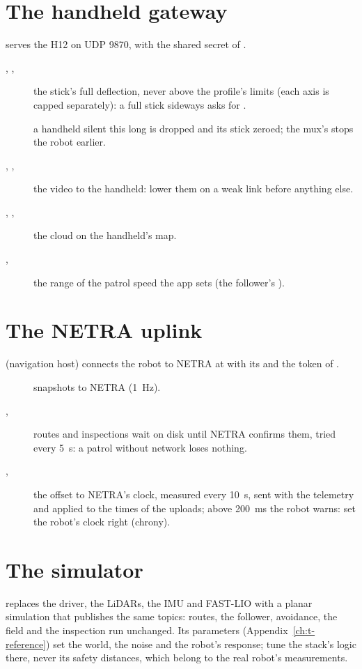 \section{The handheld gateway}

 serves the H12 on UDP  9870, with the shared secret of
.

\begin{description}
  \item[, , ] the stick's full deflection, never above the
    profile's limits (each axis is capped separately): a full stick sideways asks for .
  \item[] a handheld silent this long is dropped and its stick zeroed; the
    mux's  stops the robot earlier.
  \item[, , ] the video to the
    handheld: lower them on a weak link before anything else.
  \item[, , ] the cloud on the handheld's
    map.
  \item[, ] the range of the patrol speed the app
    sets (the follower's ).
\end{description}

\section{The NETRA uplink}

 (navigation host) connects the robot to NETRA at  with
its  and the token of .

\begin{description}
  \item[] snapshots to NETRA (\SI{1}{Hz}).
  \item[, ] routes and inspections wait on disk until
    NETRA confirms them, tried every \SI{5}{s}: a patrol without network loses nothing.
  \item[, ] the offset to NETRA's clock, measured
    every \SI{10}{s}, sent with the telemetry and applied to the times of the uploads; above
    \SI{200}{ms} the robot warns: set the robot's clock right (chrony).
\end{description}

\section{The simulator}

 replaces the driver, the LiDARs, the IMU and FAST-LIO with a planar simulation that
publishes the same topics: routes, the follower, avoidance, the field and the inspection run
unchanged. Its parameters (Appendix~\ref{ch:t-reference}) set the world, the noise and the
robot's response; tune the stack's logic there, never its safety distances, which belong to the
real robot's measurements.

